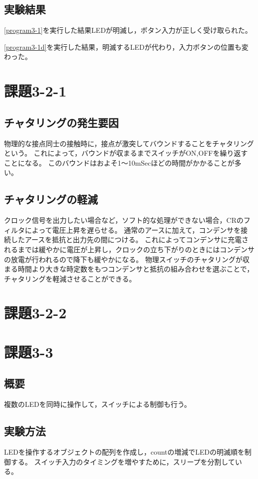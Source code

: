 \documentclass[a4paper,10pt]{jsarticle}
\begin{document}
\subsection{実験結果}
\ref{program3-1}を実行した結果LEDが明滅し，ボタン入力が正しく受け取られた。

\ref{program3-1d}を実行した結果，明滅するLEDが代わり，入力ボタンの位置も変わった。

\section{課題3-2-1}
\subsection{チャタリングの発生要因}
物理的な接点同士の接触時に，接点が激突してバウンドすることをチャタリングという。
これによって，バウンドが収まるまでスイッチがON,OFFを繰り返すことになる。
このバウンドはおよそ1〜10mSecほどの時間がかかることが多い。

\subsection{チャタリングの軽減}
クロック信号を出力したい場合など，ソフト的な処理ができない場合，CRのフィルタによって電圧上昇を遅らせる。
通常のアースに加えて，コンデンサを接続したアースを抵抗と出力先の間につける。
これによってコンデンサに充電されるまでは緩やかに電圧が上昇し，クロックの立ち下がりのときにはコンデンサの放電が行われるので降下も緩やかになる。
物理スイッチのチャタリングが収まる時間より大きな時定数をもつコンデンサと抵抗の組み合わせを選ぶことで，チャタリングを軽減させることができる。



\section{課題3-2-2}

\section{課題3-3}
\subsection{概要}
複数のLEDを同時に操作して，スイッチによる制御も行う。

\subsection{実験方法}
LEDを操作するオブジェクトの配列を作成し，countの増減でLEDの明滅順を制御する。
スイッチ入力のタイミングを増やすために，スリープを分割している。
\end{document}
